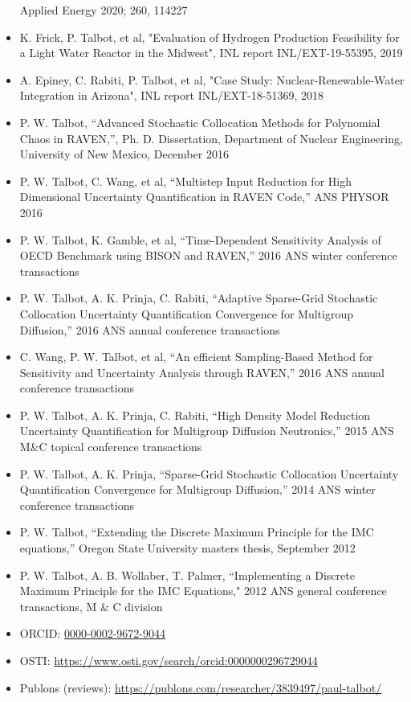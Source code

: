 \documentclass{res}
\begin{document}
\begin{resume}
\begin{itemize}
    Applied Energy 2020; 260, 114227
  \item K. Frick, P. Talbot, et al, "Evaluation of Hydrogen Production Feasibility for a Light Water Reactor
	  in the Midwest", INL report INL/EXT-19-55395, 2019
  \item A. Epiney, C. Rabiti, P. Talbot, et al, "Case Study: Nuclear-Renewable-Water Integration in Arizona", INL report INL/EXT-18-51369, 2018
  \item P. W. Talbot, ``Advanced Stochastic Collocation Methods for Polynomial Chaos in RAVEN,'', Ph. D.
    Dissertation, Department of Nuclear Engineering, University of New Mexico, December 2016
  \item P. W. Talbot, C. Wang, et al, ``Multistep Input Reduction for High
    Dimensional Uncertainty Quantification in RAVEN Code,'' ANS PHYSOR 2016
  \item P. W. Talbot, K. Gamble, et al, ``Time-Dependent Sensitivity Analysis of OECD Benchmark using BISON
    and RAVEN,'' 2016 ANS winter conference transactions
  \item P. W. Talbot, A. K. Prinja, C. Rabiti, ``Adaptive Sparse-Grid Stochastic Collocation Uncertainty
    Quantification Convergence for Multigroup Diffusion,'' 2016 ANS annual conference transactions
  \item C. Wang, P. W. Talbot, et al, ``An efficient Sampling-Based Method for Sensitivity and
    Uncertainty Analysis through RAVEN,'' 2016 ANS annual conference transactions
  \item P. W. Talbot, A. K. Prinja, C. Rabiti, ``High Density Model Reduction Uncertainty Quantification
    for Multigroup Diffusion Neutronics,'' 2015 ANS M\&C topical conference transactions
  \item P. W. Talbot, A. K. Prinja, ``Sparse-Grid Stochastic Collocation Uncertainty Quantification Convergence
    for Multigroup Diffusion,'' 2014 ANS winter conference transactions
  \item P. W. Talbot, ``Extending the Discrete Maximum Principle for the IMC equations,'' Oregon State University masters thesis, September 2012
  \item P. W. Talbot, A. B. Wollaber, T. Palmer, ``Implementing a Discrete Maximum Principle for the IMC Equations," 2012 ANS general conference transactions, M \& C division
\end{itemize}
\vspace{10pt}
\begin{itemize}
  \item ORCID: \href{https://orcid.org/0000-0002-9672-9044}{0000-0002-9672-9044}
  \item OSTI: \url{https://www.osti.gov/search/orcid:0000000296729044}
  \item Publons (reviews): \url{https://publons.com/researcher/3839497/paul-talbot/}
\end{itemize}


\end{resume}
\end{document}
